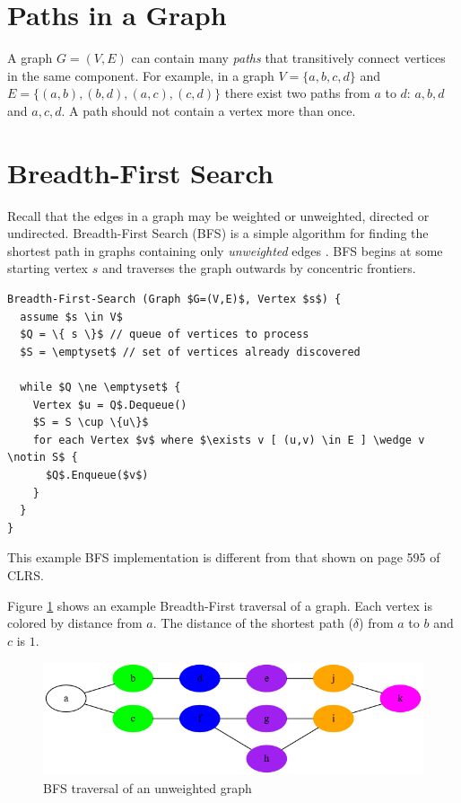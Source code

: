 \documentclass{book}
\begin{document}
\section{Paths in a Graph}
A graph $G=(V,E)$ can contain many \textit{paths} that transitively connect vertices in the same component. For example, in a graph $V=\{a,b,c,d\}$ and $E=\{(a,b),(b,d),(a,c),(c,d)\}$ there exist two paths from $a$ to $d$: $a,b,d$ and $a,c,d$. A path should not contain a vertex more than once.

\section{Breadth-First Search}
Recall that the edges in a graph may be weighted or unweighted, directed or undirected. Breadth-First Search (BFS) is a simple algorithm for finding the shortest path in graphs containing only \textit{unweighted} edges \cite{cormen2001introduction}. BFS begins at some starting vertex $s$ and traverses the graph outwards by concentric frontiers.

\begin{lstlisting}[caption={Breadth-First Search in pseudocode}, captionpos=b, mathescape, xleftmargin=.25in, xrightmargin=.25in]
Breadth-First-Search (Graph $G=(V,E)$, Vertex $s$) {
  assume $s \in V$
  $Q = \{ s \}$ // queue of vertices to process
  $S = \emptyset$ // set of vertices already discovered

  while $Q \ne \emptyset$ {
    Vertex $u = Q$.Dequeue()
    $S = S \cup \{u\}$
    for each Vertex $v$ where $\exists v [ (u,v) \in E ] \wedge v \notin S$ {
      $Q$.Enqueue($v$)
    }
  }
}
\end{lstlisting}

This example BFS implementation is different from that shown on page 595 of CLRS.

Figure \ref{bfs} shows an example Breadth-First traversal of a graph. Each vertex is colored by distance from $a$. The distance of the shortest path ($\delta$) from $a$ to $b$ and $c$ is $1$.

\begin{figure}[ht]
\centering
\includegraphics[width=\textwidth]{ch-dijkstra/bfs}
\caption{BFS traversal of an unweighted graph}
\label{bfs}
\end{figure}
\end{document}
